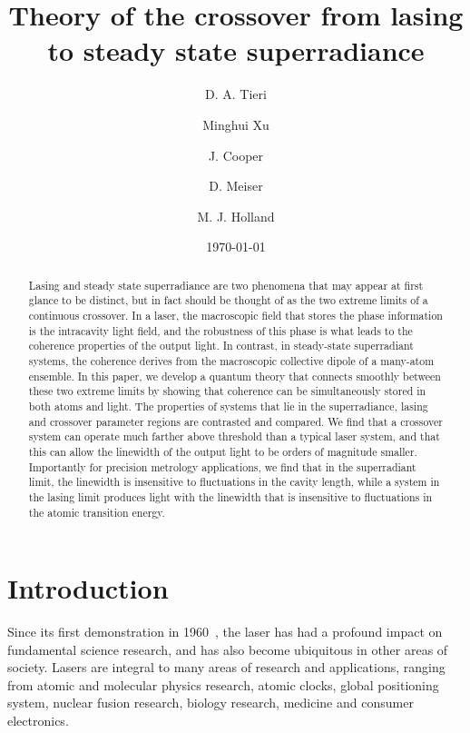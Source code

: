 \documentclass[aps,
twocolumn,
superscriptaddress,groupedaddress]{revtex4}
\begin{document}
\title{Theory of the crossover from lasing to steady state superradiance}
\author{D. A. Tieri}
\author{Minghui Xu}
\author{J. Cooper}
\author{D. Meiser}
\author{M. J. Holland}
\date{\today}

\begin{abstract}
  Lasing and steady state superradiance are two phenomena that may
  appear at first glance to be distinct, but in fact should be thought
  of as the two extreme limits of a continuous crossover. In a laser,
  the macroscopic field that stores the phase information is the
  intracavity light field, and the robustness of this phase is what
  leads to the coherence properties of the output light. In contrast,
  in steady-state superradiant systems, the coherence derives from the
  macroscopic collective dipole of a many-atom ensemble. In this
  paper, we develop a quantum theory that connects smoothly between
  these two extreme limits by showing that coherence can be
  simultaneously stored in both atoms and light. The properties of
  systems that lie in the superradiance, lasing and crossover
  parameter regions are contrasted and compared. We find that a
  crossover system can operate much farther above threshold than a
  typical laser system, and that this can allow the linewidth of the
  output light to be orders of magnitude smaller. Importantly for
  precision metrology applications, we find that in the superradiant
  limit, the linewidth is insensitive to fluctuations in the cavity
  length, while a system in the lasing limit produces light with the
  linewidth that is insensitive to fluctuations in the atomic
  transition energy.
\end{abstract}
\maketitle

\section{Introduction}
Since its first demonstration in 1960~\cite{maiman1960stimulated}, the
laser has had a profound impact on fundamental science research, and
has also become ubiquitous in other areas of society. Lasers are
integral to many areas of research and applications, ranging from
atomic and molecular physics research, atomic clocks, global
positioning system, nuclear fusion research, biology research,
medicine and consumer electronics.
\end{document}
